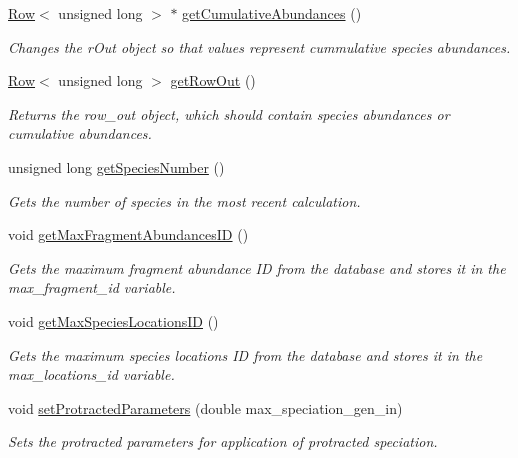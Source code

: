 \begin{DoxyCompactItemize}
\hyperlink{class_row}{Row}$<$ unsigned long $>$ $\ast$ \hyperlink{class_community_a51d90183f6a26e7d192abfd748945f2b}{get\+Cumulative\+Abundances} ()
\begin{DoxyCompactList}\small\item\em Changes the r\+Out object so that values represent cummulative species abundances. \end{DoxyCompactList}\item 
\hyperlink{class_row}{Row}$<$ unsigned long $>$ \hyperlink{class_community_a63fd8d32af6d52d009d1fd54098e4594}{get\+Row\+Out} ()
\begin{DoxyCompactList}\small\item\em Returns the row\+\_\+out object, which should contain species abundances or cumulative abundances. \end{DoxyCompactList}\item 
unsigned long \hyperlink{class_community_a8523432488d6586521c5994cad4215d8}{get\+Species\+Number} ()
\begin{DoxyCompactList}\small\item\em Gets the number of species in the most recent calculation. \end{DoxyCompactList}\item 
void \hyperlink{class_community_af6fe28e1047ed5b56fde833e4b2b30de}{get\+Max\+Fragment\+Abundances\+ID} ()
\begin{DoxyCompactList}\small\item\em Gets the maximum fragment abundance ID from the database and stores it in the max\+\_\+fragment\+\_\+id variable. \end{DoxyCompactList}\item 
void \hyperlink{class_community_a04d65ed53ea9e2cb6ce02dddccf3d33e}{get\+Max\+Species\+Locations\+ID} ()
\begin{DoxyCompactList}\small\item\em Gets the maximum species locations ID from the database and stores it in the max\+\_\+locations\+\_\+id variable. \end{DoxyCompactList}\item 
void \hyperlink{class_community_aa5643c34557be54ea2674e78a1e0c53a}{set\+Protracted\+Parameters} (double max\+\_\+speciation\+\_\+gen\+\_\+in)
\begin{DoxyCompactList}\small\item\em Sets the protracted parameters for application of protracted speciation. \end{DoxyCompactList}\item 

\end{DoxyCompactItemize}
